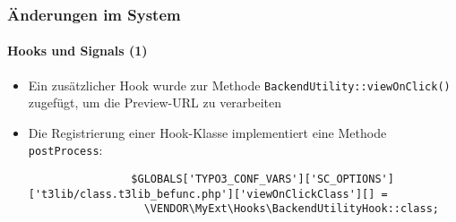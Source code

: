 \begin{frame}[fragile]
	\frametitle{Änderungen im System}
	\framesubtitle{Hooks und Signals (1)}

	\lstset{basicstyle=\tiny\ttfamily}

	\begin{itemize}

		\item Ein zusätzlicher Hook wurde zur Methode \texttt{BackendUtility::viewOnClick()}
			zugefügt, um die Preview-URL zu verarbeiten

		\item Die Registrierung einer Hook-Klasse implementiert eine Methode \texttt{postProcess}:

			\begin{lstlisting}
				$GLOBALS['TYPO3_CONF_VARS']['SC_OPTIONS']['t3lib/class.t3lib_befunc.php']['viewOnClickClass'][] =
				  \VENDOR\MyExt\Hooks\BackendUtilityHook::class;
			\end{lstlisting}

	\end{itemize}

\end{frame}

